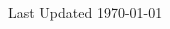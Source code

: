 \documentclass[letterpaper, 10.5pt,landscape]{article}
\begin{document}
\begin{multicols*}{3}
\vspace*{\fill}


\begin{center}
    Last Updated \today
\end{center}


\end{multicols*}

% 
\end{document}
